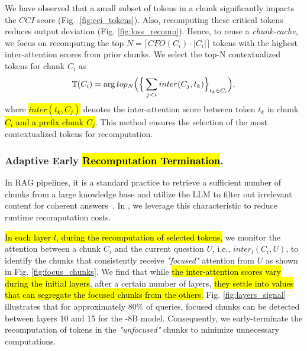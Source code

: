 We have observed that a small subset of tokens in a chunk significantly impacts the \(CCI\) score (Fig.~\ref{fig:cci_tokens}). Also, recomputing these critical tokens reduces output deviation (Fig. \ref{fig:loss_recomp}). Hence, to reuse a \textit{chunk-cache}, we focus on recomputing the top $N = \lceil CFO(C_i) \cdot |C_i| \rceil$ tokens with the highest inter-attention scores from prior chunks.
We select the top-N contextualized tokens for chunk $C_{i}$ as
\hl{\begin{align}
    \mathbb{T}(C_{i}) = \arg top_{N}\Big(\Big\{ \sum_{j<i} inter( C_{j}, t_k) \Big\}_{t_k \in C_i}\Big),
    \vspace{-5mm}
\end{align}}
where \hl{${inter}(t_k, C_j)$} denotes the inter-attention score between token $t_k$ in chunk \hl{$C_i$ and a prefix chunk $C_j$}. This method ensures the selection of the most contextualized tokens for recomputation.





    
\subsubsection{Adaptive Early \hl{Recomputation Termination}.} \label{sec: focus_selection}

In RAG pipelines, it is a standard practice to retrieve a sufficient number of chunks from a large knowledge base and utilize the LLM to filter out irrelevant content for coherent answers~\cite{wang2023learning}. In \sys, we leverage this characteristic to reduce runtime recomputation costs.

\hl{In each layer $l$, during the recomputation of selected tokens,} 
we monitor the attention between a chunk $C_i$ and the current question $U$, i.e., $inter_l(C_i, U)$, to identify the chunks that consistently receive \textit{"focused"} attention from $U$
as shown in Fig. \ref{fig:focus_chunks}. 
We find that while \hl{the inter-attention scores vary during the initial layers}, after a certain number of layers, \hl{they settle into values that can segregate the focused chunks from the others.}
Fig. \ref{fig:layers_signal}  illustrates that for approximately 80\% of queries, focused chunks can be detected between layers 10 and 15 for the -8B model.
Consequently, we early-terminate the recomputation of tokens in the \textit{"unfocused"} chunks to minimize unnecessary computations. 

